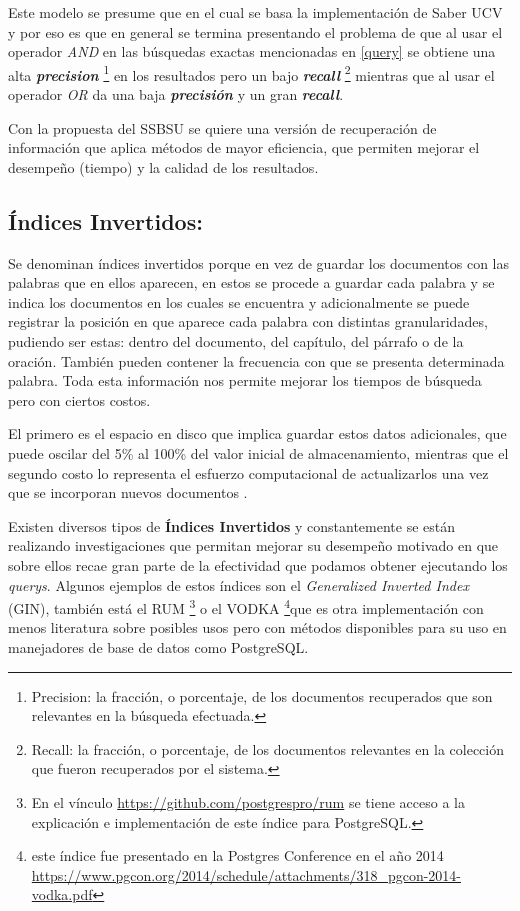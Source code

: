 \documentclass[
  10,
  spanish,
  openany]{book}
\begin{document}
Este modelo se presume que en el cual se basa la implementación de Saber UCV y por eso es que en general se termina presentando el problema de que al usar el operador \emph{AND} en las búsquedas exactas mencionadas en \ref{query} se obtiene una alta \textbf{\emph{precision}} \footnote{Precision: la fracción, o porcentaje, de los documentos recuperados que son relevantes en la búsqueda efectuada.} en los resultados pero un bajo \textbf{\emph{recall}} \footnote{Recall: la fracción, o porcentaje, de los documentos relevantes en la colección que fueron recuperados por el sistema.} mientras que al usar el operador \emph{OR} da una baja \textbf{\emph{precisión}} y un gran \textbf{\emph{recall}}.

Con la propuesta del SSBSU se quiere una versión de recuperación de información que aplica métodos de mayor eficiencia, que permiten mejorar el desempeño (tiempo) y la calidad de los resultados.

\hypertarget{invind}{%
\subsection{Índices Invertidos:}\label{invind}}

Se denominan índices invertidos porque en vez de guardar los documentos con las palabras que en ellos aparecen, en estos se procede a guardar cada palabra y se indica los documentos en los cuales se encuentra y adicionalmente se puede registrar la posición en que aparece cada palabra con distintas granularidades, pudiendo ser estas: dentro del documento, del capítulo, del párrafo o de la oración. También pueden contener la frecuencia con que se presenta determinada palabra. Toda esta información nos permite mejorar los tiempos de búsqueda pero con ciertos costos.

El primero es el espacio en disco que implica guardar estos datos adicionales, que puede oscilar del 5\% al 100\% del valor inicial de almacenamiento, mientras que el segundo costo lo representa el esfuerzo computacional de actualizarlos una vez que se incorporan nuevos documentos \citep{Mahapatra2011}.

Existen diversos tipos de \textbf{Índices Invertidos} y constantemente se están realizando investigaciones que permitan mejorar su desempeño motivado en que sobre ellos recae gran parte de la efectividad que podamos obtener ejecutando los \emph{querys}. Algunos ejemplos de estos índices son el \emph{Generalized Inverted Index} (GIN), también está el RUM \footnote{En el vínculo \url{https://github.com/postgrespro/rum} se tiene acceso a la explicación e implementación de este índice para PostgreSQL.} o el VODKA \footnote{este índice fue presentado en la Postgres Conference en el año 2014 \url{https://www.pgcon.org/2014/schedule/attachments/318_pgcon-2014-vodka.pdf}}que es otra implementación con menos literatura sobre posibles usos pero con métodos disponibles para su uso en manejadores de base de datos como PostgreSQL.
\end{document}
